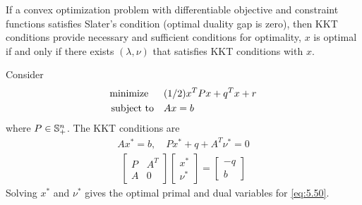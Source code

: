 If a convex optimization problem with differentiable objective and constraint functions satisfies Slater's condition (optimal duality gap is zero), then KKT conditions provide necessary and sufficient conditions for optimality, \ie
$x$ is optimal if and only if there exists $(\lambda,\nu)$ that satisfies KKT conditions with $x$.
\begin{example}
  Consider
  \begin{align}
    \text{minimize\;\;}\quad& (1/2)x^TPx+q^Tx+r \label{eq:5.50}\\
    \text{subject to}  \quad& Ax=b\nonumber
  \end{align}
  where $P\in\mathbb{S}_+^n$. The KKT conditions are
  \begin{align*}
    Ax^\ast=b,\quad Px^\ast+q+A^T\nu^\ast=0
  \end{align*}
  \ie
  \begin{align*}
    \begin{bmatrix}
      P&A^T\\A&0
    \end{bmatrix}
    \begin{bmatrix}
      x^\ast\\\nu^\ast
    \end{bmatrix}=
    \begin{bmatrix}
      -q\\b
    \end{bmatrix}
  \end{align*}
  Solving $x^\ast$ and $\nu^\ast$ gives the optimal primal and dual variables for \eqref{eq:5.50}.
\end{example}

